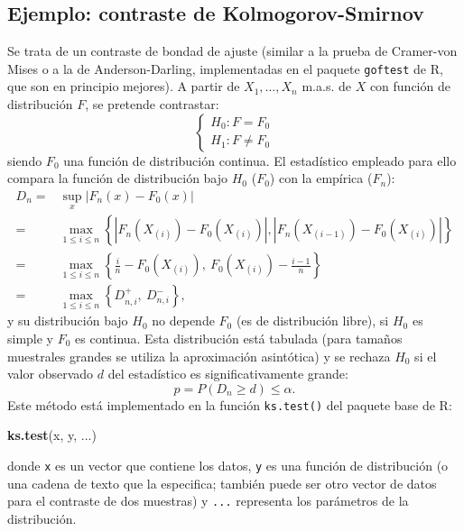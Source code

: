 \documentclass[
]{book}
\newenvironment{Shaded}{\begin{snugshade}}{\end{snugshade}}
\newcommand{\KeywordTok}[1]{\textcolor[rgb]{0.13,0.29,0.53}{\textbf{#1}}}
\newcommand{\NormalTok}[1]{#1}
\theoremstyle{definition}
\theoremstyle{definition}
\theoremstyle{definition}
\theoremstyle{remark}
\begin{document}
\hypertarget{ejemplo-contraste-de-kolmogorov-smirnov}{%
\subsection{Ejemplo: contraste de Kolmogorov-Smirnov}\label{ejemplo-contraste-de-kolmogorov-smirnov}}

Se trata de un contraste de bondad de ajuste (similar a la prueba de
Cramer-von Mises o a la de Anderson-Darling, implementadas en el paquete
\texttt{goftest} de R, que son en principio mejores).
A partir de \(X_1,\ldots ,X_n\) m.a.s. de \(X\) con función de distribución \(F\),
se pretende contrastar:
\[\left \{ 
\begin{array}{l}
H_0 : F = F_0 \\ 
H_1 : F \neq F_0 
\end{array}
\right. \]
siendo \(F_0\) una función de distribución continua.
El estadístico empleado para ello compara la función de distribución bajo
\(H_0\) (\(F_0\)) con la empírica (\(F_n\)):
\[\begin{aligned}
    D_n=&\sup_{x}|F_n(x)-F_0(x)| \\
    =&\max_{1 \leq i\leq n}\left \{
    |F_n(X_{(i)})-F_0(X_{(i)})|,|F_n(X_{(i-1)})-F_0(X_{(i)})|\right \} \\
    =&\max_{1 \leq i\leq n}\left \{ \frac{i}{n}-F_0(X_{(i)}), \ F_0(X_{(i)})-\frac{i-1}{n}\right \} \\
    =&\max_{1 \leq i\leq n}\left \{ D_{n,i}^{+},\ D_{n,i}^{-}\right \},
\end{aligned}\]
y su distribución bajo \(H_0\) no depende \(F_0\) (es de distribución libre),
si \(H_0\) es simple y \(F_0\) es continua.
Esta distribución está tabulada (para tamaños muestrales grandes se utiliza
la aproximación asintótica) y se rechaza \(H_0\) si el valor observado \(d\)
del estadístico es significativamente grande:
\[p = P \left( D_n \geq d \right) \leq \alpha.\]
Este método está implementado en la función \texttt{ks.test()} del paquete base de R:

\begin{Shaded}
\begin{Highlighting}[]
\KeywordTok{ks.test}\NormalTok{(x, y, ...)}
\end{Highlighting}
\end{Shaded}

donde \texttt{x} es un vector que contiene los datos, \texttt{y} es una función de distribución
(o una cadena de texto que la especifica; también puede ser otro vector de datos
para el contraste de dos muestras) y \texttt{...} representa los parámetros de la distribución.
\end{document}
